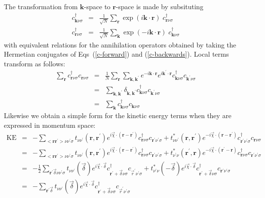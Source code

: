 The transformation from ${\mathbf k}$-space to ${\mathbf r}$-space
is made by subsituting 
\begin{eqnarray}
\label{c-forward}
c^{\dagger}_{{\mathbf k}\nu\sigma} & = & \frac{1}{\sqrt{N}}
\sum_{{\mathbf r}} \exp(i \mathbf{k}\cdot\mathbf{r}) \; 
c^{\dagger}_{{\mathbf r}\nu\sigma} \\
\label{c-backwards}
c^{\dagger}_{{\mathbf r}\nu\sigma} & = & \frac{1}{\sqrt{N}}
\sum_{{\mathbf k}} \exp(-i \mathbf{k}\cdot\mathbf{r}) \; 
c^{\dagger}_{{\mathbf k}\nu\sigma} 
\end{eqnarray}
with equivalent relations for the annihilation operators
obtained by taking the 
Hermetian conjugates of Eqs~(\ref{c-forward}) and (\ref{c-backwards}).
Local terms transform as follows:
\begin{eqnarray}
\sum_{\mathbf{r}} c^{\dagger}_{\mathbf{r}\nu\sigma} c_{\mathbf{r}\nu\sigma} & = &
\frac{1}{N} \sum_{\mathbf{r}} \sum_{\mathbf{k},\mathbf{k}^{\prime}}
e^{-i \mathbf{k}\cdot\mathbf{r}} e^{i \mathbf{k}^{\prime}\cdot\mathbf{r}}
c^{\dagger}_{\mathbf{k}\nu\sigma} c_{\mathbf{k}^{\prime}\nu\sigma} \\
& = & \sum_{\mathbf{k},\mathbf{k}^{\prime}} 
\delta_{\mathbf{k},\mathbf{k}^{\prime}}
c^{\dagger}_{\mathbf{k}\nu\sigma} c_{\mathbf{k}^{\prime}\nu\sigma} \\
& = & \sum_{\mathbf{k}} c^{\dagger}_{\mathbf{k}\nu\sigma} c_{\mathbf{k}\nu\sigma}
\end{eqnarray}  
Likewise we obtain a simple form for the kinetic energy terms
when they are expressed in momentum space:
\begin{eqnarray}
\mathrm{KE} & = &
-\sum_{<\mathbf{r}\mathbf{r}^{\prime}>\nu\nu^{\prime}\sigma} 
t_{\nu\nu^{\prime}}(\mathbf{r},\mathbf{r}^{\prime})
e^{i\vec{\chi}\cdot(\mathbf{r}-\mathbf{r}^{\prime})}
c^{\dagger}_{\mathbf{r}\nu\sigma}c_{\mathbf{r}^{\prime}\nu^{\prime}\sigma} + 
 t_{\nu\nu^{\prime}}^*(\mathbf{r},\mathbf{r}^{\prime}) 
e^{-i\vec{\chi}\cdot (\mathbf{r}-\mathbf{r}^{\prime})}
c^{\dagger}_{\mathbf{r}^{\prime}\nu^{\prime}\sigma}c_{\mathbf{r}\nu\sigma} \\
& = & -\sum_{<\mathbf{r}\mathbf{r}^{\prime}>\nu\nu^{\prime}\sigma} 
t_{\nu\nu^{\prime}}(\mathbf{r},\mathbf{r}^{\prime})
e^{i\vec{\chi}\cdot(\mathbf{r}-\mathbf{r}^{\prime})}
c^{\dagger}_{\mathbf{r}\nu\sigma}c_{\mathbf{r}^{\prime}\nu^{\prime}\sigma} +
 t_{\nu^{\prime}\nu}^*(\mathbf{r}^{\prime},\mathbf{r})
e^{-i\vec{\chi}\cdot(\mathbf{r}^{\prime}-\mathbf{r})}
c^{\dagger}_{\mathbf{r}\nu\sigma}c_{\mathbf{r}^{\prime}\nu^{\prime}\sigma} \\
& = & -\frac{1}{2} \sum_{\mathbf{r}^{\prime}\vec{\delta}\nu\nu^{\prime}\sigma} 
t_{\nu\nu^{\prime}}(\vec{\delta}) e^{i\vec{\chi}\cdot \vec{\delta}} 
c^{\dagger}_{\mathbf{r}^{\prime}+\vec{\delta}\nu\sigma} c_{\vec{r}^{\prime}\nu^{\prime}\sigma}
+ t_{\nu^{\prime}\nu}^*(-\vec{\delta}) e^{ i \vec{\chi} \cdot \vec{\delta}} 
c^{\dagger}_{\mathbf{r}^{\prime}+ \vec{\delta}\nu\sigma} c_{\mathbf{r}^{\prime}\nu^{\prime}\sigma} \\
& = & - \sum_{\mathbf{r}^{\prime}\vec{\delta}} t_{\nu\nu^{\prime}}(\vec{\delta}) 
e^{i \vec{\chi}\cdot \vec{\delta}} 
c^{\dagger}_{\mathbf{r}^{\prime}+\vec{\delta}\nu\sigma} c_{\vec{r}^{\prime}\nu^{\prime}\sigma}
\end{eqnarray}
